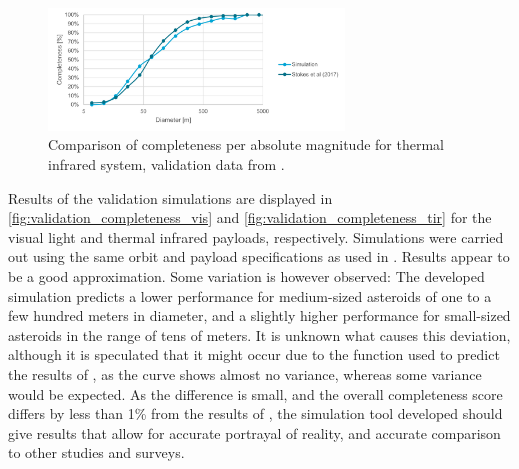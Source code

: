 \begin{figure}[htbp]
 \centering
 \includegraphics[width=0.7\textwidth]{img/validation_completeness_tir.pdf}
 \caption{Comparison of completeness per absolute magnitude for thermal infrared system, validation data from \cite{2017NEOSDT}.}
 \label{fig:validation_completeness_tir}
\end{figure}

Results of the validation simulations are displayed in \autoref{fig:validation_completeness_vis} and \autoref{fig:validation_completeness_tir} for the visual light and thermal infrared payloads, respectively. Simulations were carried out using the same orbit and payload specifications as used in \cite{2017NEOSDT}. Results appear to be a good approximation. Some variation is however observed: The developed simulation predicts a lower performance for medium-sized asteroids of one to a few hundred meters in diameter, and a slightly higher performance for small-sized asteroids in the range of tens of meters. It is unknown what causes this deviation, although it is speculated that it might occur due to the function used to predict the results of \cite{2017NEOSDT}, as the curve shows almost no variance, whereas some variance would be expected. As the difference is small, and the overall completeness score differs by less than 1\% from the results of \cite{2017NEOSDT}, the simulation tool developed should give results that allow for accurate portrayal of reality, and accurate comparison to other studies and surveys.

